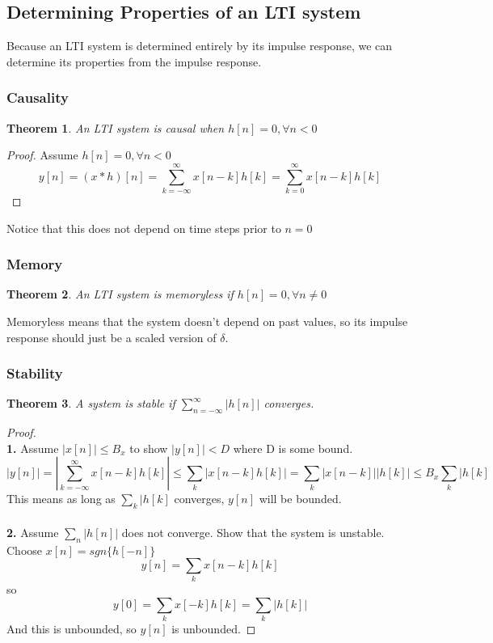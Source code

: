 \documentclass{article}
\newtheorem{theorem}{Theorem}
\newtheorem{proof}{Proof}
\begin{document}
\subsection{Determining Properties of an LTI system}
Because an LTI system is determined entirely by its impulse response, we can determine its properties from the impulse response.
\subsubsection{Causality}
\begin{theorem}
    An LTI system is causal when $h[n] = 0, \forall n < 0$
\end{theorem}
\begin{proof}
Assume $h[n] = 0, \forall n < 0$
$$y[n] = (x*h)[n] = \sum_{k=-\infty}^{\infty}{x[n-k]h[k]}=\sum_{k=0}^{\infty}{x[n-k]h[k]}$$
\end{proof}
Notice that this does not depend on time steps prior to $n=0$
\subsubsection{Memory}
\begin{theorem}
    An LTI system is memoryless if $h[n]=0, \forall n \ne 0$
\end{theorem}
Memoryless means that the system doesn't depend on past values, so its impulse response should
just be a scaled version of $\delta$.
\subsubsection{Stability}
\begin{theorem}
    A system is stable if $\sum_{n=-\infty}^{\infty}{|h[n]|}$ converges.
\end{theorem}
\begin{proof}
    \textbf{\\1. } Assume $|x[n]| \le B_x$ to show $|y[n]| < D$ where D is some bound.
    $$|y[n]| = |\sum_{k=-\infty}^{\infty}{x[n-k]h[k]}| \le \sum_{k}{|x[n-k]h[k]|} = \sum_{k}{|x[n-k]||h[k]|}\le B_x\sum_{k}{|h[k]}$$
    This means as long as $\sum_{k}{|h[k]}$ converges, $y[n]$ will be bounded.\\
    \textbf{\\2. } Assume $\sum_{n}{|h[n]|}$ does not converge. Show that the system is unstable.
    Choose $x[n]=sgn\{h[-n]\}$
    $$y[n]=\sum_{k}{x[n-k]h[k]}$$ so 
    $$y[0] = \sum_{k}{x[-k]h[k]} = \sum_{k}{|h[k]|}$$
    And this is unbounded, so $y[n]$ is unbounded.
\end{proof}
\end{document}
